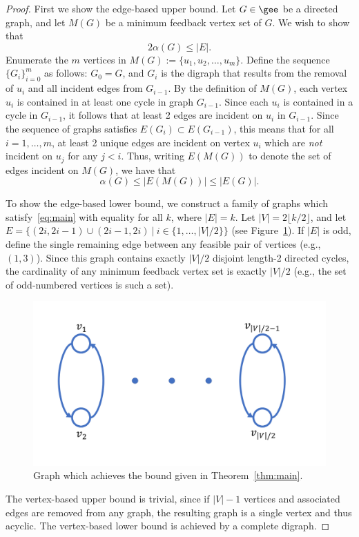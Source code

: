 \documentclass[CRMATH,Unicode,manuscript]{cedram}
\begin{document}
\begin{proof}
First we show the edge-based upper bound.
Let $G\in\gee$ be a directed graph, and let $M(G)$ be a minimum feedback vertex set of $G$.
We wish to show that 
\begin{equation}
2\alpha(G)\leq |E|.
\end{equation}
Enumerate the $m$ vertices in $M(G):=\{u_1,u_2,\ldots,u_m\}$.
Define the sequence $\{G_i\}_{i=0}^m$ as follows: $G_0=G$, and $G_i$ is the digraph that results from the removal of $u_i$ and all incident edges from $G_{i-1}$.
By the definition of $M(G)$, each vertex $u_i$ is contained in at least one cycle in graph $G_{i-1}$.
Since each $u_i$ is contained in a cycle in $G_{i-1}$, it follows that at least 2 edges are incident on $u_i$ in $G_{i-1}$.
Since the sequence of graphs satisfies $E(G_{i})\subset E(G_{i-1})$, this means that for all $i=1,\ldots,m$, at least 2 unique edges are incident on vertex $u_i$ which are \emph{not} incident on $u_j$ for any $j<i$.
%
Thus, writing $E(M(G))$ to denote the set of edges incident on $M(G)$, we have that
\begin{equation}
\alpha(G)\leq|E(M(G))|\leq |E(G)|.
\end{equation}

To show the edge-based lower bound, we construct a family of graphs which satisfy~\eqref{eq:main} with equality for all $k$, where $|E|=k$.
Let $|V|=2\lfloor k/2\rfloor$, and let $E=\{(2i,2i-1)\cup(2i-1,2i)\ |\ i\in\{1,\ldots,|V|/2\}\}$ (see Figure~\ref{fig:graph}).
If $|E|$ is odd, define the single remaining edge between any feasible pair of vertices (e.g., $(1,3)$).
Since this graph contains exactly $|V|/2$ disjoint length-2 directed cycles, the cardinality of any minimum feedback vertex set is exactly $|V|/2$ (e.g., the set of odd-numbered vertices is such a set).
%

\begin{figure}
\centering
\includegraphics[width=.5\textwidth]{gfx/graph}
\caption{\label{fig:graph} Graph which achieves the bound given in Theorem~\ref{thm:main}.}
\end{figure}


The vertex-based upper bound is trivial, since if $|V|-1$ vertices and associated edges are removed from any graph, the resulting graph is a single vertex and thus acyclic.
The vertex-based lower bound is achieved by a complete digraph.
\end{proof}






\nocite{*}


\end{document}
